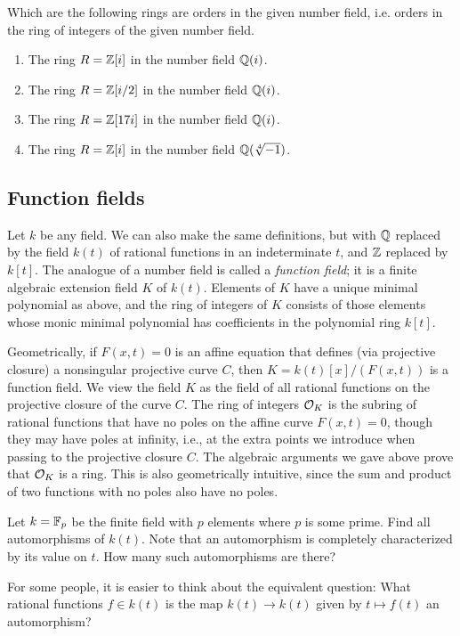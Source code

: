 \begin{exercise}
	Which are the following rings are orders in the given
	number field, i.e. orders in the ring of integers of the
	given number field.
	\begin{enumerate}
	\item The ring $R = \mathbb{Z}[i]$ in the number field $\mathbb{Q}(i)$.
	\item The ring $R = \mathbb{Z}[i/2]$ in the number field $\mathbb{Q}(i)$.
	\item The ring $R = \mathbb{Z}[17i]$ in the number field $\mathbb{Q}(i)$.
	\item The ring $R = \mathbb{Z}[i]$ in the number field $\mathbb{Q}(\sqrt[4]{-1})$.
	\end{enumerate}
\end{exercise}

\subsection{Function fields}
Let $k$ be any field.  We can also make the same definitions, but with $\mathbb{Q}$
replaced by the field $k(t)$ of rational functions in an indeterminate
$t$, and $\mathbb{Z}$ replaced by $k[t]$.
The analogue of a number field is called a {\em function field}; it is
a finite algebraic extension field $K$ of $k(t)$.  Elements of $K$
have a unique minimal polynomial as above, and the ring of integers of
$K$ consists of those elements whose monic minimal polynomial has
coefficients in the polynomial ring $k[t]$.  

Geometrically, if $F(x,t)=0$ is an affine equation that defines (via
projective closure) a nonsingular projective curve $C$, then
$K=k(t)[x]/(F(x,t))$ is a function field.  We view the field $K$ as
the field of all rational functions on the projective closure of the
curve $C$.  The ring of integers $\mathcal{O}_K$ is the subring of rational
functions that have no poles on the affine curve $F(x,t)=0$, though
they may have poles at infinity, i.e., at the extra points we
introduce when passing to the projective closure $C$.  The algebraic
arguments we gave above prove that $\mathcal{O}_K$ is a ring.  This is also
geometrically intuitive, since the sum and product of two functions
with no poles also have no poles.

\begin{exercise}
	Let $k = \mathbb{F}_p$ be the finite field with $p$ elements where $p$ is some prime. Find all automorphisms of $k(t)$. Note that an automorphism is completely characterized by its value on $t$. How many such automorphisms are there?

	\begin{hint}
		For some people, it is easier to think about the equivalent question: What rational functions $f\in k(t)$ is the map $k(t)\to k(t)$ given by $t\mapsto f(t)$ an automorphism?
	\end{hint}
\end{exercise}

